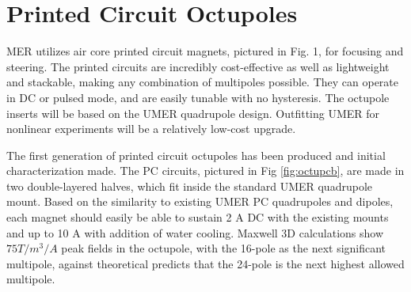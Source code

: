 
\section{Printed Circuit Octupoles}


\begin{figure}[]
 \label{fig:octupcb}
\label{fig:octurotcoil}
\end{figure}


MER utilizes air core printed circuit magnets, pictured in Fig. 1, for focusing and steering. The printed circuits are incredibly cost-effective as well as lightweight and stackable, making any combination of multipoles possible. They can operate in DC or pulsed mode, and are easily tunable with no hysteresis. 
The octupole inserts will be based on the UMER quadrupole design. Outfitting UMER for nonlinear experiments will be a relatively low-cost upgrade.

The first generation of printed circuit octupoles has been produced and initial characterization made. The PC circuits, pictured in Fig \ref{fig:octupcb}, are made in two double-layered halves, which fit inside the standard UMER quadrupole mount. Based on the similarity to existing UMER PC quadrupoles and dipoles, each magnet should easily be able to sustain 2 A DC with the existing mounts and up to 10 A with addition of water cooling. Maxwell 3D calculations show $75 T/m^3/A$ peak fields in the octupole, with the 16-pole as the next significant multipole, against theoretical predicts that the 24-pole is the next highest allowed multipole. \cite{VenturiniThesis}

